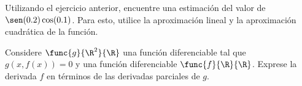 \documentclass[a4,11pt]{aleph-notas}
\begin{document}
\begin{ejer}
Utilizando el ejercicio anterior, encuentre una estimación del valor de $\sen(0.2)\cos(0.1)$. Para esto, utilice la aproximación lineal y la aproximación cuadrática de la función.
\end{ejer}

\begin{ejer}
Considere $\func{g}{\R^2}{\R}$ una función diferenciable tal que $g(x,f(x))=0$ y una función diferenciable $\func{f}{\R}{\R}$. Exprese la derivada $f$ en términos de las derivadas parciales de $g$.
\end{ejer}
\end{document}
